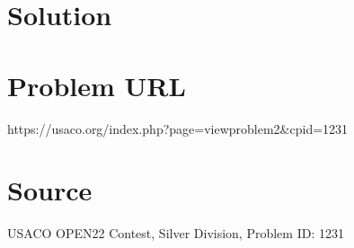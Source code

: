 \documentclass[12pt]{article}
\begin{document}
\section*{Solution}


\section*{Problem URL}
https://usaco.org/index.php?page=viewproblem2&cpid=1231

\section*{Source}
USACO OPEN22 Contest, Silver Division, Problem ID: 1231
\end{document}
